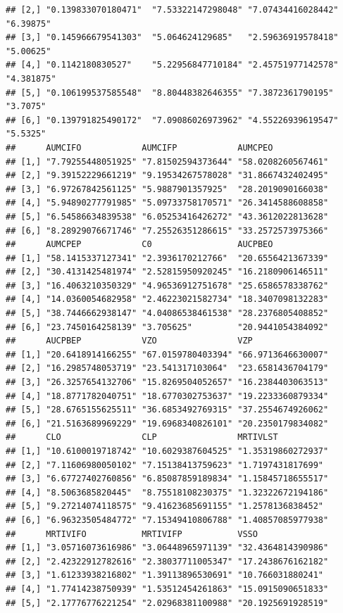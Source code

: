 \documentclass[12pt,]{krantz}
\theoremstyle{definition}
\theoremstyle{definition}
\theoremstyle{definition}
\theoremstyle{remark}
\begin{document}
\begin{verbatim}
## [2,] "0.139833070180471"  "7.53322147298048" "7.07434416028442" "6.39875" 
## [3,] "0.145966679541303"  "5.064624129685"   "2.59636919578418" "5.00625" 
## [4,] "0.1142180830527"    "5.22956847710184" "2.45751977142578" "4.381875"
## [5,] "0.106199537585548"  "8.80448382646355" "7.3872361790195"  "3.7075"  
## [6,] "0.139791825490172"  "7.09086026973962" "4.55226939619547" "5.5325"  
##      AUMCIFO            AUMCIFP            AUMCPEO           
## [1,] "7.79255448051925" "7.81502594373644" "58.0208260567461"
## [2,] "9.39152229661219" "9.19534267578028" "31.8667432402495"
## [3,] "6.97267842561125" "5.9887901357925"  "28.2019090166038"
## [4,] "5.94890277791985" "5.09733758170571" "26.3414588608858"
## [5,] "6.54586634839538" "6.05253416426272" "43.3612022813628"
## [6,] "8.28929076671746" "7.25526351286615" "33.2572573975366"
##      AUMCPEP            C0                 AUCPBEO           
## [1,] "58.1415337127341" "2.3936170212766"  "20.6556421367339"
## [2,] "30.4131425481974" "2.52815950920245" "16.2180906146511"
## [3,] "16.4063210350329" "4.96536912751678" "25.6586578338762"
## [4,] "14.0360054682958" "2.46223021582734" "18.3407098132283"
## [5,] "38.7446662938147" "4.04086538461538" "28.2376805408852"
## [6,] "23.7450164258139" "3.705625"         "20.9441054384092"
##      AUCPBEP            VZO                VZP               
## [1,] "20.6418914166255" "67.0159780403394" "66.9713646630007"
## [2,] "16.2985748053719" "23.541317103064"  "23.6581436704179"
## [3,] "26.3257654132706" "15.8269504052657" "16.2384403063513"
## [4,] "18.8771782040751" "18.6770302753637" "19.2233360879334"
## [5,] "28.6765155625511" "36.6853492769315" "37.2554674926062"
## [6,] "21.5163689969229" "19.6968340826101" "20.2350179834082"
##      CLO                CLP                MRTIVLST          
## [1,] "10.6100019718742" "10.6029387604525" "1.35319860272937"
## [2,] "7.11606980050102" "7.15138413759623" "1.7197431817699" 
## [3,] "6.67727402760856" "6.85087859189834" "1.15845718655517"
## [4,] "8.5063685820445"  "8.75518108230375" "1.32322672194186"
## [5,] "9.27214074118575" "9.41623685691155" "1.2578136838452" 
## [6,] "6.96323505484772" "7.15349410806788" "1.40857085977938"
##      MRTIVIFO           MRTIVIFP           VSSO              
## [1,] "3.05716073616986" "3.06448965971139" "32.4364814390986"
## [2,] "2.42322912782616" "2.38037711005347" "17.2438676162182"
## [3,] "1.61233938216802" "1.39113896530691" "10.766031880241" 
## [4,] "1.77414238750939" "1.53512454261863" "15.0915090651833"
## [5,] "2.17776776221254" "2.02968381100988" "20.1925691928519"

\end{verbatim}
\end{document}
